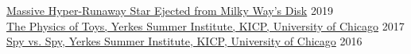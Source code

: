 \documentclass[margin]{res}
\begin{document}
\begin{resume}
\href{https://news.umich.edu/u-m-researchers-confirm-massive-hyper-runaway-star-ejected-from-the-milky-way-disk/}{Massive Hyper-Runaway Star Ejected from Milky Way's Disk} \hfill 2019\\
\href{http://kicp.uchicago.edu/events/kicp_yerkes.html#id_959}{The Physics of Toys, Yerkes Summer Institute, KICP, University of Chicago} \hfill 2017\\
\href{http://kicp.uchicago.edu/events/kicp_yerkes.html#id_785}{Spy vs. Spy, Yerkes Summer Institute, KICP, University of Chicago} \hfill 2016\\















\end{resume}
\end{document}
